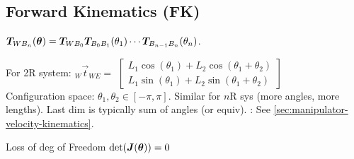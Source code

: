 \subsection{Forward Kinematics (FK)}
$\bm{T}_{WB_n}(\bm{\theta}) = \bm{T}_{WB_0} \bm{T}_{B_0B_1}(\theta_1) \cdots \bm{T}_{B_{n - 1}B_n}(\theta_n)$.

For 2R system: ${_W}\vec{t}_{WE} =$
{\scriptsize
$ \begin{bmatrix}
        L_1 \cos(\theta_1) + L_2 \cos(\theta_1 + \theta_2) \\
        L_1 \sin(\theta_1) + L_2 \sin(\theta_1 + \theta_2)
    \end{bmatrix}$\\
}
Configuration space: $\theta_1, \theta_2 \in [-\pi, \pi]$.
 Similar for $n$R sys (more angles, more lengths).
Last dim is typically sum of angles (or equiv).
: See \ref{sec:manipulator-velocity-kinematics}.

\shortdefinition[Singularity] Loss of deg of Freedom $\det(\bm{J}(\bm{\theta})) = 0$
